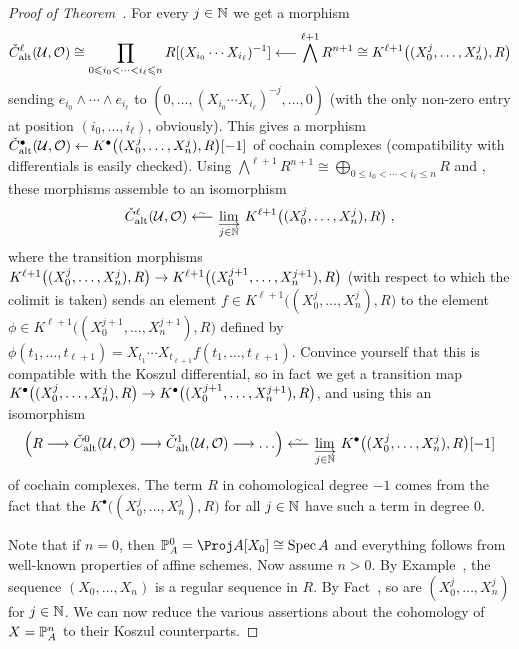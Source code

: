 \documentclass[a4paper,parskip=half,numbers=enddot, DIV=12]{scrreprt}
\renewcommand{\leq}{\leqslant}
\begin{document}
\begin{proof}[Proof of Theorem~]
	For every $j\in\mathbb{N}$ we get a morphism
	\begin{align*}
		\check{C}_\alt^\ell(\Uu,\Oo)\cong \prod_{0\leq i_0<\cdots<i_\ell\leq n}R[(X_{i_0}\cdots X_{i_\ell})^{-1}]\lmorphism \bigwedge^{\ell+1}R^{n+1}\cong K^{\ell+1}\big((X_0^j,\ldots,X_n^j),R\big)
	\end{align*}
	sending $e_{i_0}\wedge \cdots \wedge e_{i_\ell}$ to $(0,\ldots,(X_{i_0}\cdots X_{i_\ell})^{-j},\ldots,0)$ (with the only non-zero entry at position $(i_0,\ldots,i_\ell)$, obviously). This gives a morphism $\check{C}_\alt^\bullet(\Uu,\Oo)\lmorphism K^\bullet\big((X_0^j,\ldots,X_n^j),R\big)[-1]$ of cochain complexes (compatibility with differentials is easily checked). Using $\bigwedge^{\ell+1}R^{n+1}\cong \bigoplus _{0\leq i_0<\cdots <i_\ell\leq n}R$ and , these morphisms assemble to an isomorphism
	\begin{align*}
		\check{C}_\alt^\ell(\Uu,\Oo)\lisomorphism \colimit[j\in \IN] K^{\ell+1}\big((X_0^j,\ldots,X_n^j),R\big)\;,
	\end{align*}
	where the transition morphisms $K^{\ell+1}\big((X_0^j,\ldots,X_n^j),R\big)\morphism K^{\ell+1}\big((X_0^{j+1},\ldots,X_n^{j+1}),R\big)$ (with respect to which the colimit is taken) sends an element $f\in K^{\ell+1}\big((X_0^j,\ldots,X_n^j),R\big)$ to the element $\phi\in K^{\ell+1}\big((X_0^{j+1},\ldots,X_n^{j+1}),R\big)$ defined by $\phi(t_1,\ldots,t_{\ell+1})=X_{t_1}\cdots X_{t_{\ell+1}}f(t_1,\ldots,t_{\ell+1})$. Convince yourself that this is compatible with the Koszul differential, so in fact we get a transition map $K^\bullet\big((X_0^j,\ldots,X_n^j),R\big)\morphism K^\bullet\big((X_0^{j+1},\ldots,X_n^{j+1}),R\big)$, and using this an isomorphism
	\begin{align}\lbl{eq:CechKoszulIso2}
		\left(R\morphism\check{C}_\alt^0(\Uu,\Oo)\morphism\check{C}_\alt^1(\Uu,\Oo)\morphism\ldots\right)\lisomorphism \colimit[j\in\IN]K^\bullet\big((X_0^j,\ldots,X_n^j),R\big)[-1]
	\end{align}
	 of cochain complexes. The term $R$ in cohomological degree $-1$ comes from the fact that the $K^\bullet\big((X_0^j,\ldots,X_n^j),R\big)$ for all $j\in\mathbb{N}$ have such a term in degree $0$.
	
	Note that if $n=0$, then $\IP_A^0=\Proj A[X_0]\cong \Spec A$ and everything follows from well-known properties of affine schemes. Now assume $n>0$. By Example~, the sequence $(X_0,\ldots,X_n)$ is a regular sequence in $R$. By Fact~, so are $(X_0^j,\ldots,X_n^j)$ for $j\in\mathbb{N}$. We can now reduce the various assertions about the cohomology of $X=\mathbb{P}_A^n$ to their Koszul counterparts.
	

\end{proof}
\end{document}
